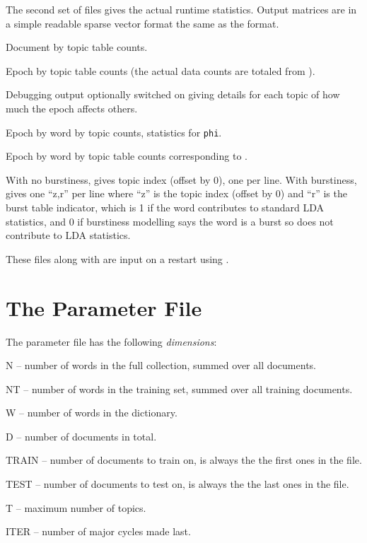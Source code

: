 \documentclass[a4paper,english]{article}
\begin{document}
The second set of files gives the actual runtime statistics.
Output matrices are in a simple readable sparse vector format
the same as the  format.
\begin{Description}\setlength{\itemsep}{0cm}
\item[\File{RepStem.cdt}] Document by topic table counts.
\item[\File{RepStem.cpet}] Epoch by topic table counts
(the actual data counts are totaled from ).
\item[\File{RepStem.istats}] Debugging output optionally switched on
giving details for each topic of how much the epoch affects others.
\item[\File{RepStem.mevt}] Epoch by word by topic counts,
statistics for \texttt{phi}.
\item[\File{RepStem.sevt}] Epoch by word by topic table counts
corresponding to .
\item[\File{RepStem.zt}] With no burstiness, gives topic
index (offset by 0), one per line.  
With burstiness, gives one ``z,r'' per line where ``z'' is the
topic index (offset by 0) and ``r'' is the burst table indicator, 
which is 1 if the word
contributes to standard LDA statistics, and
0 if burstiness modelling says the word is a burst
so does not contribute to LDA statistics.
\end{Description}
These files along with  are input
on a restart using .

\section{The Parameter File}

The parameter file has the following \emph{dimensions}:
\begin{Description}[T]
\item{N} -- number of words in the full collection,
          summed over all documents.
\item{NT} -- number of words in the training set,
          summed over all training documents.
\item{W} -- number of words in the dictionary.
\item{D} -- number of documents in total.
\item{TRAIN} -- number of documents to train on, is always the
the first ones in the file.
\item{TEST} -- number of documents to test on, is always the
the last ones in the file.
\item{T} -- maximum number of topics.
\item{ITER} -- number of major cycles made last.


\end{Description}
\end{document}
